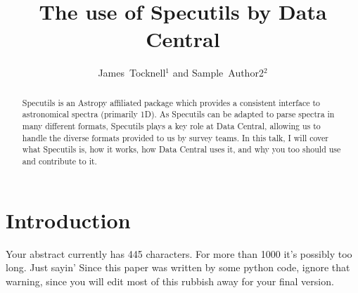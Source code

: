 \documentclass[11pt,twoside]{article}
\begin{document}
\title{The use of Specutils by Data Central}

\author{James~Tocknell$^1$ and Sample~Author2$^2$}




  
\begin{abstract}

Specutils is an Astropy affiliated package which provides a consistent interface to astronomical spectra (primarily 1D). As Specutils can be adapted to parse spectra in many different formats, Specutils plays a key role at Data Central, allowing us to handle the diverse formats provided to us by survey teams. In this talk, I will cover what Specutils is, how it works, how Data Central uses it, and why you too should use and contribute to it.
  
\end{abstract}

\section{Introduction}

Your abstract currently has 445 characters. For more than 1000
it's possibly too long. Just sayin' Since this paper was written by
some python code, ignore that warning, since you will edit most of
this rubbish away for your final version.
\end{document}
